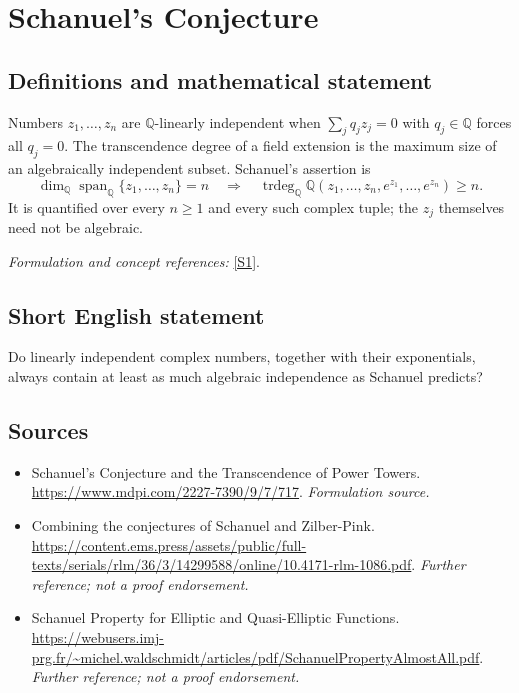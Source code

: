 \documentclass[11pt]{article}
\begin{document}
\section*{\texorpdfstring{Schanuel's Conjecture}{Schanuel's Conjecture}}\label{3367}
\subsection{Definitions and mathematical statement}
Numbers $z_1,\ldots,z_n$ are ${\mathbb{Q}}$-linearly independent when $\sum_jq_jz_j=0$ with $q_j\in{\mathbb{Q}}$ forces all $q_j=0$. The transcendence degree of a field extension is the maximum size of an algebraically independent subset. Schanuel's assertion is
\[
 \dim_{{\mathbb{Q}}}\operatorname{span}_{{\mathbb{Q}}}\{z_1,\ldots,z_n\}=n
 \quad\Longrightarrow\quad
 \operatorname{trdeg}_{{\mathbb{Q}}}{\mathbb{Q}}(z_1,\ldots,z_n,e^{z_1},\ldots,e^{z_n})\ge n.
\]
It is quantified over every $n\ge1$ and every such complex tuple; the $z_j$ themselves need not be algebraic.
\par\smallskip\textit{Formulation and concept references:} \href{https://www.mdpi.com/2227-7390/9/7/717}{[S1]}.

\subsection{Short English statement}
Do linearly independent complex numbers, together with their exponentials, always contain at least as much algebraic independence as Schanuel predicts?
\subsection{Sources}
\begin{itemize}
\item[S1]Schanuel's Conjecture and the Transcendence of Power Towers.
\url{https://www.mdpi.com/2227-7390/9/7/717}.
\textit{Formulation source.}
\item[S2]Combining the conjectures of Schanuel and Zilber-Pink.
\url{https://content.ems.press/assets/public/full-texts/serials/rlm/36/3/14299588/online/10.4171-rlm-1086.pdf}.
\textit{Further reference; not a proof endorsement.}
\item[S3]Schanuel Property for Elliptic and Quasi-Elliptic Functions.
\url{https://webusers.imj-prg.fr/~michel.waldschmidt/articles/pdf/SchanuelPropertyAlmostAll.pdf}.
\textit{Further reference; not a proof endorsement.}
\end{itemize}
\end{document}
